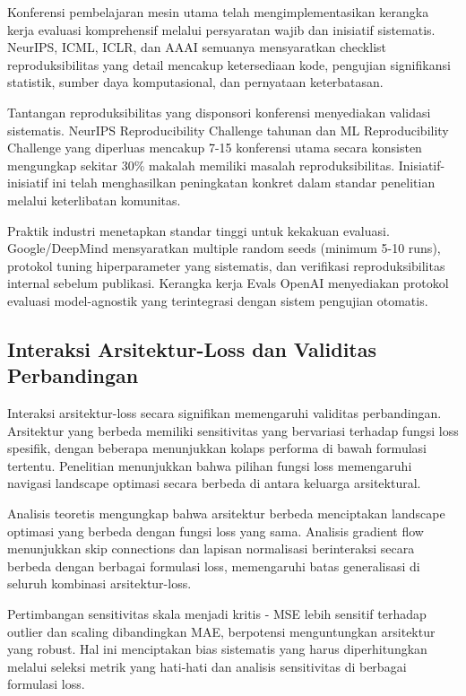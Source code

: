 \documentclass[12pt,a4paper]{article}
\begin{document}
Konferensi pembelajaran mesin utama telah mengimplementasikan kerangka kerja evaluasi komprehensif melalui persyaratan wajib dan inisiatif sistematis. NeurIPS, ICML, ICLR, dan AAAI semuanya mensyaratkan checklist reproduksibilitas yang detail mencakup ketersediaan kode, pengujian signifikansi statistik, sumber daya komputasional, dan pernyataan keterbatasan.

Tantangan reproduksibilitas yang disponsori konferensi menyediakan validasi sistematis. NeurIPS Reproducibility Challenge tahunan dan ML Reproducibility Challenge yang diperluas mencakup 7-15 konferensi utama secara konsisten mengungkap sekitar 30\% makalah memiliki masalah reproduksibilitas. Inisiatif-inisiatif ini telah menghasilkan peningkatan konkret dalam standar penelitian melalui keterlibatan komunitas.

Praktik industri menetapkan standar tinggi untuk kekakuan evaluasi. Google/DeepMind mensyaratkan multiple random seeds (minimum 5-10 runs), protokol tuning hiperparameter yang sistematis, dan verifikasi reproduksibilitas internal sebelum publikasi. Kerangka kerja Evals OpenAI menyediakan protokol evaluasi model-agnostik yang terintegrasi dengan sistem pengujian otomatis.

\subsection{Interaksi Arsitektur-Loss dan Validitas Perbandingan}

Interaksi arsitektur-loss secara signifikan memengaruhi validitas perbandingan. Arsitektur yang berbeda memiliki sensitivitas yang bervariasi terhadap fungsi loss spesifik, dengan beberapa menunjukkan kolaps performa di bawah formulasi tertentu. Penelitian menunjukkan bahwa pilihan fungsi loss memengaruhi navigasi landscape optimasi secara berbeda di antara keluarga arsitektural.

Analisis teoretis mengungkap bahwa arsitektur berbeda menciptakan landscape optimasi yang berbeda dengan fungsi loss yang sama. Analisis gradient flow menunjukkan skip connections dan lapisan normalisasi berinteraksi secara berbeda dengan berbagai formulasi loss, memengaruhi batas generalisasi di seluruh kombinasi arsitektur-loss.

Pertimbangan sensitivitas skala menjadi kritis - MSE lebih sensitif terhadap outlier dan scaling dibandingkan MAE, berpotensi menguntungkan arsitektur yang robust. Hal ini menciptakan bias sistematis yang harus diperhitungkan melalui seleksi metrik yang hati-hati dan analisis sensitivitas di berbagai formulasi loss.
\end{document}
